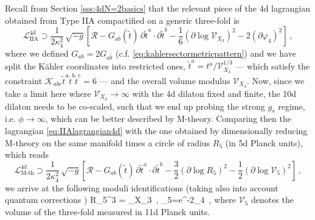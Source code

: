 Recall from Section \ref{sss:4dN=2basics} that the relevant piece of the 4d lagrangian obtained from Type IIA compactified on a generic three-fold is
%
\begin{equation}\label{eq:IIAlagrangian4d}
	\mathcal{L}_{\text{IIA}}^{\text{4d}} \supset \dfrac{1}{2\kappa_{4}^2}\,  \sqrt{- g} \left[\mathcal{R} - G_{a b}(\tilde{t})\, \partial \tilde{t}^a \cdot \partial \tilde{t}^b - \frac{1}{6} \left( \partial \log \mathcal{V}_{X_3} \right)^2 - 2\left( \partial \varphi_4 \right)^2 \right]\, ,
\end{equation}
%
where we defined $G_{a b} = 2 G_{a \bar b}$ (c.f. \eqref{eq:kahlersectormetricpattern}) and we have split the K\"ahler coordinates into restricted ones, $\tilde{t}^a = t^a/\mathcal{V}_{X_3}^{1/3}$ --- which satisfy the constraint $\mathcal{K}_{abc}\tilde{t}^a \tilde{t}^b \tilde{t}^c = 6$ --- and the overall volume modulus $\mathcal{V}_{X_3}$. Now, since we take a limit here where $\mathcal{V}_{X_3} \to \infty$ with the 4d dilaton fixed and finite, the 10d dilaton needs to be co-scaled, such that we end up probing the strong $g_s$ regime, i.e. $\phi \to \infty$, which can be better described by M-theory. Comparing then the lagrangian \eqref{eq:IIAlagrangian4d} with the one obtained by dimensionally reducing M-theory on the same manifold times a circle of radius $R_5$ (in 5d Planck units), which reads \cite{Cadavid:1995bk}
%
\begin{equation}
	\mathcal{L}_{\text{M-th}}^{\text{4d}} \supset \dfrac{1}{2\kappa_{4}^2}\,  \sqrt{- g} \left[\mathcal{R} - G_{a b}(\tilde{t})\, \partial \tilde{t}^a \cdot \partial \tilde{t}^b - \frac{3}{2} \left( \partial \log R_5 \right)^2 - \frac{1}{2} \left( \partial \log \mathcal{V}_5 \right)^2 \right]\, ,
\end{equation}
%
we arrive at the following moduli identifications (taking also into account quantum corrections \cite{Gopakumar:1998ii,Gopakumar:1998jq,Lawrence:1997jr})
%
\beq
\label{eq:modulimatching}
	R_5^3 = _{X_3}\, , \qquad {}_5=e^{-2\varphi_4}\, ,
\eeq
%
where $\mathcal{V}_5$ denotes the volume of the three-fold measured in 11d Planck units.
	
